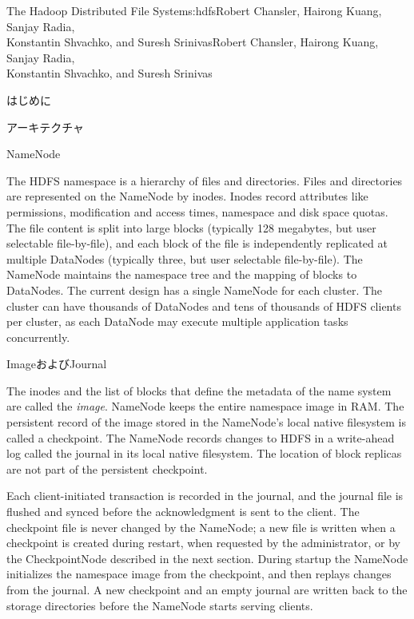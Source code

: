 \begin{aosachaptertoc}{The Hadoop Distributed File System}{s:hdfs}{Robert Chansler, Hairong Kuang, Sanjay Radia, \\ Konstantin Shvachko, and Suresh Srinivas}{Robert Chansler, Hairong Kuang, Sanjay Radia, \\ \hspace*{0.9cm} Konstantin Shvachko, and Suresh Srinivas}
\begin{aosasect1}{はじめに}
\end{aosasect1}

\begin{aosasect1}{アーキテクチャ}

\begin{aosasect2}{NameNode}

The HDFS namespace is a hierarchy of files and directories. Files and
directories are represented on the NameNode by inodes.  Inodes record
attributes like permissions, modification and access times, namespace
and disk space quotas. The file content is split into large blocks
(typically 128 megabytes, but user selectable file-by-file), and each
block of the file is independently replicated at multiple DataNodes
(typically three, but user selectable file-by-file). The NameNode
maintains the namespace tree and the mapping of blocks to DataNodes.
 The current design has a single
NameNode for each cluster. The cluster can have thousands of DataNodes
and tens of thousands of HDFS clients per cluster, as each DataNode
may execute multiple application tasks concurrently.

\end{aosasect2}

\begin{aosasect2}{ImageおよびJournal}

The inodes and the list of blocks that define the metadata of the name
system are called the \emph{image}. NameNode keeps the entire namespace image
in RAM\@. The persistent record of the image stored in the NameNode's
local native filesystem is called a checkpoint. The NameNode records
changes to HDFS in a write-ahead log called the journal in
its local native filesystem. The location of block replicas are not
part of the persistent checkpoint.

Each client-initiated transaction is recorded in the journal, and the
journal file is flushed and synced before the acknowledgment is sent
to the client. The checkpoint file is never changed by the NameNode;
a new file is written when a checkpoint is created during
restart, when requested by the administrator, or by the CheckpointNode
described in the next section. During startup the NameNode initializes
the namespace image from the checkpoint, and then replays changes from
the journal. A new checkpoint and an empty journal are written back to
the storage directories before the NameNode starts serving clients.


\end{aosasect2}
\end{aosasect1}
\end{aosachaptertoc}

